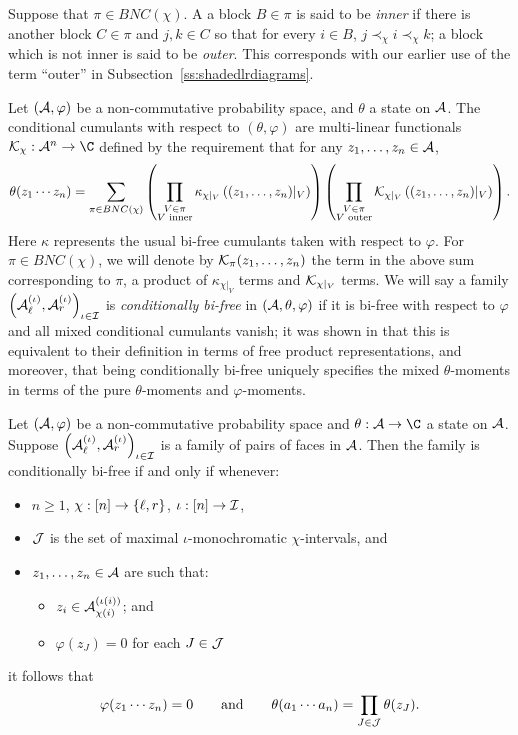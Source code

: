 Suppose that $\pi \in BNC(\chi)$.
A a block $B \in \pi$ is said to be \emph{inner} if there is another block $C \in \pi$ and $j, k \in C$ so that for every $i \in B$, $j \prec_\chi i \prec_\chi k$; a block which is not inner is said to be \emph{outer}.
This corresponds with our earlier use of the term ``outer'' in Subsection~\ref{ss:shadedlrdiagrams}.

Let $(\mathcal{A}, \varphi)$ be a non-commutative probability space, and $\theta$ a state on $\mathcal{A}$.
The conditional cumulants with respect to $(\theta, \varphi)$ are multi-linear functionals $\cK_\chi : \A^n \to \C$ defined by the requirement that for any $z_1, \ldots, z_n \in \mathcal{A}$,
$$\theta(z_1\cdots z_n) = \sum_{\pi\in BNC(\chi)}\left(\prod_{\substack{V\in\pi\\V \text{ inner}}} \kappa_{\chi|_V}\left((z_1, \ldots, z_n)|_V\right)\right)\left(\prod_{\substack{V\in\pi\\V\text{ outer}}}\mathcal{K}_{\chi|_V}\left((z_1, \ldots, z_n)|_V\right)\right).$$
Here $\kappa$ represents the usual bi-free cumulants taken with respect to $\varphi$.
For $\pi \in BNC(\chi)$, we will denote by $\mathcal{K}_\pi(z_1, \ldots, z_n)$ the term in the above sum corresponding to $\pi$, a product of $\kappa_{\chi|_V}$ terms and $\mathcal{K}_{\chi|_V}$ terms.
We will say a family $\left(\mathcal{A}_\ell^{(\iota)}, \mathcal{A}_r^{(\iota)}\right)_{\iota\in\mathcal{I}}$ is \emph{conditionally bi-free} in $(\mathcal{A}, \theta, \varphi)$ if it is bi-free with respect to $\varphi$ and all mixed conditional cumulants vanish; it was shown in \cite{gu2016conditionally} that this is equivalent to their definition in terms of free product representations, and moreover, that being conditionally bi-free uniquely specifies the mixed $\theta$-moments in terms of the pure $\theta$-moments and $\varphi$-moments.


\begin{theorem}
	Let $(\mathcal{A}, \varphi)$ be a non-commutative probability space and $\theta : \A \to \C$ a state on $\mathcal{A}$.
	Suppose $\left(\mathcal{A}_\ell^{(\iota)}, \mathcal{A}_r^{(\iota)}\right)_{\iota\in\mathcal{I}}$ is a family of pairs of faces in $\mathcal{A}$.
	Then the family is conditionally bi-free if and only if whenever:
	\begin{itemize}
		\item $n \geq 1$, $\chi : [n] \to \left\{\ell, r\right\}$, $\iota : [n] \to \mathcal{I}$,
		\item $\mathcal{J}$ is the set of maximal $\iota$-monochromatic $\chi$-intervals, and
		\item $z_1, \ldots, z_n \in \mathcal{A}$ are such that:
			\begin{itemize}
				\item $z_i \in \mathcal{A}_{\chi(i)}^{(\iota(i))}$; and
				\item $\varphi(z_J) = 0$ for each $J \in \mathcal{J}$
			\end{itemize}
	\end{itemize}
	it follows that
	$$\varphi(z_1\cdots z_n) = 0 \qquad\text{and}\qquad \theta(a_1\cdots a_n) = \prod_{J \in \mathcal{J}} \theta(z_J).$$
\end{theorem}

